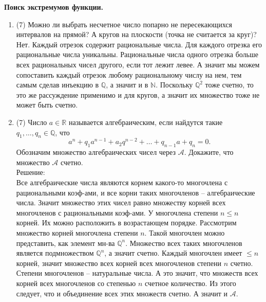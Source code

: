 \documentclass[a4paper]{article}
\begin{document}
\noindent\textbf{Поиск экстремумов функции.}

\begin{enumerate}
	\item (7) Можно ли выбрать несчетное число попарно не пересекающихся интервалов на прямой? А кругов на плоскости (точка не считается за круг)?\\
Нет. Каждый отрезок содержит рациональные числа. Для каждого отрезка его рациональные числа уникальны. Рациональные числа одного отрезка больше всех рациональных чисел другого, если тот лежит левее. А значит мы можем сопоставить каждый отрезок любому рациональному числу на нем, тем самым сделав инъекцию в $\mathbb Q$, а значит и в $\mathbb N$. Поскольку $\mathbb Q^2$ тоже счетно, то это же рассуждение применимо и для кругов, а значит их множество тоже не может быть счетно. 
	\item (7) Число $a\in \mathbb R$ называется алгебраическим, если найдутся такие $q_1,\dots,q_n\in \mathbb Q$, что
	\[
	    a^n + q_1a^{n-1} + a_2q^{n-2} + \dots + q_{n-1}a + q_n = 0.
	\]
    Обозначим множество алгебраических чисел через $\mathcal{A}$. Докажите, что множество $\mathcal{A}$ счетно.\\
    Решение:\\
    Все алгебраические числа являются корнем какого-то многочлена с рациональными коэф-ами, и все корни таких многочленов -- алгебраические числа. Значит множество этих чисел равно множеству корней всех многочленов с рациональными коэф-ами. У многочлена степени $n \le n$ корней. Их можно расположить в возрастающем порядке. Рассмотрим множество корней многочлена степени $n$. Такой многочлен можно представить, как элемент мн-ва $\mathbb Q^n$. Множество всех таких многочленов является подмножеством $\mathbb Q^n$, а значит счетно. Каждый многочлен имеет $\le n$ корней, значит множество всех корней всех многочленов степени $n$ счетно. Степени многочленов -- натуральные числа. А это значит, что множеств всех корней всех многочленов со степенью $n$ счетное количество. Из этого следует, что и объединение всех этих множеств счетно. А значит и $\mathcal{A}$. 
	

\end{enumerate}
\end{document}
